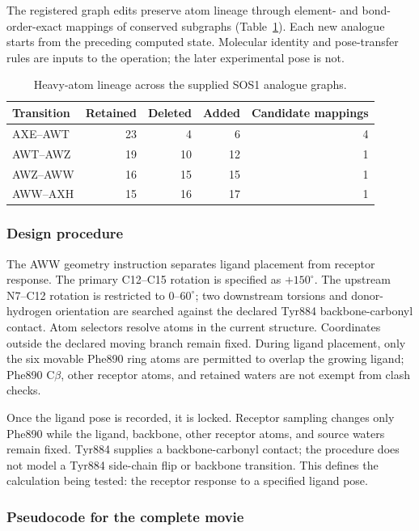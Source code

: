 \documentclass[11pt]{article}
\begin{document}
\begin{small}
The registered graph edits preserve atom lineage through element- and bond-order-exact mappings of conserved subgraphs (Table~\ref{tab:appA_lineage}). Each new analogue starts from the preceding computed state. Molecular identity and pose-transfer rules are inputs to the operation; the later experimental pose is not.

\begin{table}[htbp]
\centering\small
\caption{Heavy-atom lineage across the supplied SOS1 analogue graphs.}
\label{tab:appA_lineage}
\begin{tabular}{@{}lrrrr@{}}
\toprule
\textbf{Transition} & \textbf{Retained} & \textbf{Deleted} & \textbf{Added} & \textbf{Candidate mappings}\\
\midrule
AXE--AWT & 23 & 4 & 6 & 4\\
AWT--AWZ & 19 & 10 & 12 & 1\\
AWZ--AWW & 16 & 15 & 15 & 1\\
AWW--AXH & 15 & 16 & 17 & 1\\
\bottomrule
\end{tabular}
\end{table}

\subsubsection{Design procedure}

The AWW geometry instruction separates ligand placement from receptor response. The primary C12--C15 rotation is specified as $+150^{\circ}$. The upstream N7--C12 rotation is restricted to $0$--$60^{\circ}$; two downstream torsions and donor-hydrogen orientation are searched against the declared Tyr884 backbone-carbonyl contact. Atom selectors resolve atoms in the current structure. Coordinates outside the declared moving branch remain fixed. During ligand placement, only the six movable Phe890 ring atoms are permitted to overlap the growing ligand; Phe890 C$\beta$, other receptor atoms, and retained waters are not exempt from clash checks.

Once the ligand pose is recorded, it is locked. Receptor sampling changes only Phe890 while the ligand, backbone, other receptor atoms, and source waters remain fixed. Tyr884 supplies a backbone-carbonyl contact; the procedure does not model a Tyr884 side-chain flip or backbone transition. This defines the calculation being tested: the receptor response to a specified ligand pose.

\subsubsection{Pseudocode for the complete movie}


\end{small}
\end{document}
